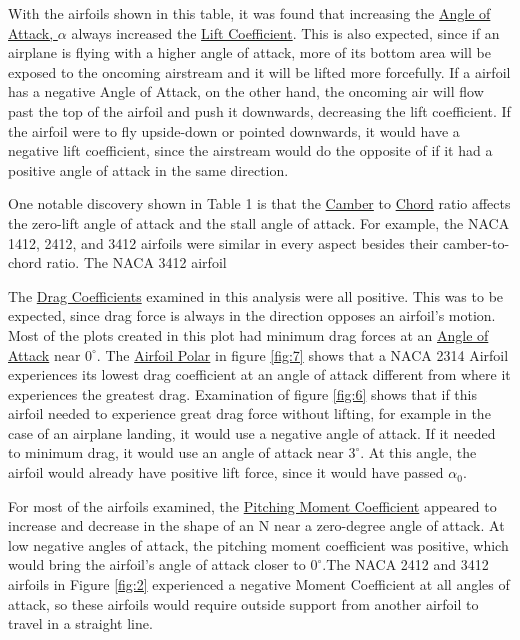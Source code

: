 \documentclass{article}
\begin{document}
With the airfoils shown in this table, it was found that increasing the \hyperlink{alpha}{Angle of Attack, $\alpha$} always increased the \hyperlink{CL}{Lift Coefficient}. This is also expected, since if an airplane is flying with a higher angle of attack, more of its bottom area will be exposed to the oncoming airstream and it will be lifted more forcefully. If a airfoil has a negative Angle of Attack, on the other hand, the oncoming air will flow past the top of the airfoil and push it downwards, decreasing the lift coefficient. If the airfoil were to fly upside-down or pointed downwards, it would have a negative lift coefficient, since the airstream would do the opposite of if it had a positive angle of attack in the same direction.\newline

One notable discovery shown in Table 1 is that the \hyperlink{Camber}{Camber} to \hyperlink{c}{Chord} ratio affects the zero-lift angle of attack and the stall angle of attack. For example, the NACA 1412, 2412, and 3412 airfoils were similar in every aspect besides their camber-to-chord ratio. The NACA 3412 airfoil 

The \hyperlink{CD}{Drag Coefficients} examined in this analysis were all positive. This was to be expected, since drag force is always in the direction opposes an airfoil's motion. Most of the plots created in this plot had minimum drag forces at an \hyperlink{alpha}{Angle of Attack} near $0^{\circ}$. The \hyperlink{AP}{Airfoil Polar} in figure \ref{fig:7} shows that a NACA 2314 Airfoil experiences its lowest drag coefficient at an angle of attack different from where it experiences the greatest drag. Examination of figure \ref{fig:6} shows that if this airfoil needed to experience great drag force without lifting, for example in the case of an airplane landing, it would use a negative angle of attack. If it needed to minimum drag, it would use an angle of attack near $3^{\circ}$. At this angle, the airfoil would already have positive lift force, since it would have passed $\alpha_{0}$. \newline

For most of the airfoils examined, the \hyperlink{CM}{Pitching Moment Coefficient} appeared to increase and decrease in the shape of an N near a zero-degree angle of attack. At low negative angles of attack, the pitching moment coefficient was positive, which would bring the airfoil's angle of attack closer to $0^{\circ}$.The NACA 2412 and 3412 airfoils in Figure \ref{fig:2} experienced a negative Moment Coefficient at all angles of attack, so these airfoils would require outside support from another airfoil to travel in a straight line.\newline
\end{document}
